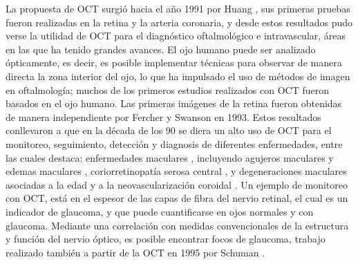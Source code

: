 La propuesta de OCT surgió hacia el año 1991 por Huang \etal \cite{Huang1991}, sus primeras pruebas fueron realizadas \exvivo en la retina y la arteria coronaria, y desde estos resultados pudo verse la utilidad de OCT para el diagnóstico oftalmológico e intravascular, áreas en las que ha tenido grandes avances. El ojo humano puede ser analizado ópticamente, es decir, es posible implementar técnicas para observar de manera directa la zona interior del ojo, lo que ha impulsado el uso de métodos de imagen en oftalmología; muchos de los primeros estudios realizados con OCT fueron basados en el ojo humano. Las primeras imágenes \invivo de la retina fueron obtenidas de manera independiente por Fercher \etal \cite{Fercher1993} y Swanson \etal \cite{Swanson1993} en 1993. Estos resultados conllevaron a que en la década de los 90 se diera un alto uso de OCT para el monitoreo, seguimiento, detección y diagnosis de diferentes enfermedades, entre las cuales destaca: enfermedades maculares \cite{Puliafito1995}, incluyendo agujeros maculares \cite{Hee1995_2} y edemas maculares \cite{Hee1995},  coriorretinopatía serosa central \cite{Hee1995_3}, y degeneraciones maculares asociadas a la edad y a la neovascularización coroidal \cite{Hee1995_4}. Un ejemplo de monitoreo con OCT, está en el espesor de las capas de fibra del nervio retinal, el cual es un indicador de glaucoma, y que puede cuantificarse en ojos normales y con glaucoma. Mediante una correlación con medidas convencionales de la estructura y función del nervio óptico, es posible encontrar focos de glaucoma, trabajo realizado también a partir de la OCT en 1995 por Schuman \etal \cite{Schuman1995}.

